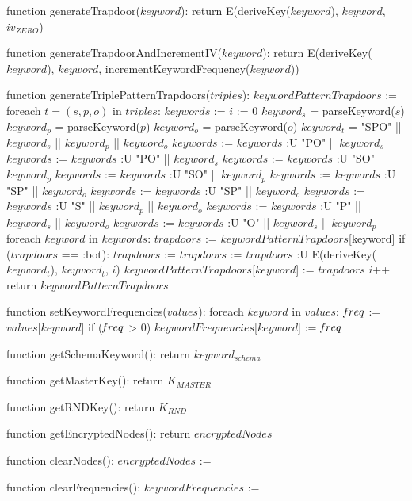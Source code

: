 function generateTrapdoor($keyword$):
    return E(deriveKey($keyword$), $keyword$, $iv_{ZERO}$)
	
function generateTrapdoorAndIncrementIV($keyword$):
    return E(deriveKey($keyword$), $keyword$, incrementKeywordFrequency($keyword$))

function generateTriplePatternTrapdoors($triples$):
    $keywordPatternTrapdoors$ := {}
    foreach $t = (s,p,o)$ in $triples$:
        $keywords$ := {}
        $i$ := 0
        $keyword_s$ = parseKeyword($s$)
        $keyword_p$ = parseKeyword($p$)
        $keyword_o$ = parseKeyword($o$)
        $keyword_t$ = "SPO" || $keyword_s$ || $keyword_p$ || $keyword_o$
        $keywords$ := $keywords$ :U { "PO" || $keyword_s$ }
        $keywords$ := $keywords$ :U { "PO" || $keyword_s$ }
        $keywords$ := $keywords$ :U { "SO" || $keyword_p$ }
        $keywords$ := $keywords$ :U { "SO" || $keyword_p$ }
        $keywords$ := $keywords$ :U { "SP" || $keyword_o$ }
        $keywords$ := $keywords$ :U { "SP" || $keyword_o$ }
        $keywords$ := $keywords$ :U { "S" || $keyword_p$ || $keyword_o$ }
        $keywords$ := $keywords$ :U { "P" || $keyword_s$ || $keyword_o$ }
        $keywords$ := $keywords$ :U { "O" || $keyword_s$ || $keyword_p$ }
        foreach $keyword$ in $keywords$:
            $trapdoors$ := $keywordPatternTrapdoors$[keyword]
            if ($trapdoors$ == :bot):
                $trapdoors$ := {}
            $trapdoors$ := $trapdoors$ :U { E(deriveKey($keyword_t$), $keyword_t$, $i$) }
            $keywordPatternTrapdoors$[$keyword$] := $trapdoors$
            $i$++
    return $keywordPatternTrapdoors$
    
function setKeywordFrequencies($values$):
    foreach $keyword$ in $values$:
        $\textrm{\emph{f}}req$ := $values$[$keyword$]
        if ($\textrm{\emph{f}}req$ > 0)
            $keywordFrequencies$[$keyword$] := $\textrm{\emph{f}}req$
            
function getSchemaKeyword():
    return $keyword_{schema}$

function getMasterKey():
    return $K_{MASTER}$

function getRNDKey():
    return $K_{RND}$

function getEncryptedNodes():
    return $encryptedNodes$

function clearNodes():
    $encryptedNodes$ := {}

function clearFrequencies():
    $keywordFrequencies$ := {}